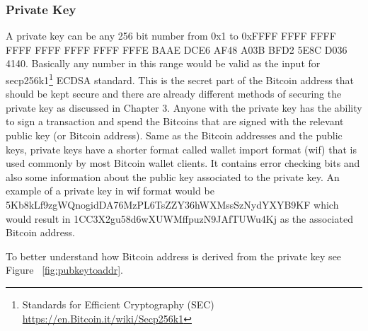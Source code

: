 \subsubsection{Private Key}
A private key can be any 256 bit number from 0x1 to 0xFFFF FFFF FFFF FFFF FFFF FFFF FFFF FFFE BAAE DCE6 AF48 A03B BFD2 5E8C D036 4140. Basically any number in this range would be valid as the input for secp256k1\footnote{Standards for Efficient Cryptography (SEC) \url{https://en.Bitcoin.it/wiki/Secp256k1}} ECDSA standard. This is the secret part of the Bitcoin address that should be kept secure and there are already different methods of securing the private key as discussed in Chapter 3. Anyone with the private key has the ability to sign a transaction and spend the Bitcoins that are signed with the relevant public key (or Bitcoin address). 
Same as the Bitcoin addresses and the public keys, private keys have a shorter format called wallet import format (wif) that is used commonly by most Bitcoin wallet clients. It contains error checking bits and also some information about the public key associated to the private key. An example of a private key in wif format would be 5Kb8kLf9zgWQnogidDA76MzPL6TsZZY36hWXMssSzNydYXYB9KF which would result in 1CC3X2gu58d6wXUWMffpuzN9JAfTUWu4Kj as the associated Bitcoin address.

To better understand how Bitcoin address is derived from the private key see Figure  ~\ref{fig:pubkeytoaddr}.

